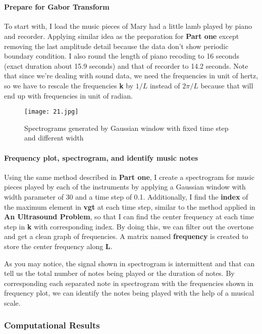 \documentclass[10pt]{article}
\begin{document}
\part{}
\subsection*{Prepare for Gabor Transform}
To start with, I load the music pieces of Mary had a little lamb played by piano and recorder. Applying similar idea as the preparation for \textbf{Part one} except removing the last amplitude detail because the data don't show periodic boundary condition. I also round the length of piano recoding to 16 seconds (exact duration about 15.9 seconds) and that of recorder to 14.2 seconds. Note that since we're dealing with sound data, we need the frequencies in unit of hertz, so we have to rescale the frequencies \textbf{k} by $1/L$ instead of $2\pi/L$ because that will end up with frequencies in unit of radian.
\begin{figure}[!hb]
	\texttt{[image: 21.jpg]}
    \caption{Spectrograms generated by Gaussian window with fixed time step and different width}
    \centering
\end{figure}
\subsection*{Frequency plot, spectrogram, and identify music notes}
Using the same method described in \textbf{Part one}, I create a spectrogram for music pieces played by each of the instruments by applying a Gaussian window with width parameter of 30 and a time step of 0.1. Additionally, I find the \textbf{index} of the maximum element in \textbf{vgt} at each time step, similar to the method applied in \textbf{An Ultrasound Problem}, so that I can find the center frequency at each time step in \textbf{k} with corresponding index. By doing this, we can filter out the overtone and get a clean graph of frequencies. A matrix named \textbf{frequency} is created to store the center frequency along \textbf{L}.
\par
As you may notice, the signal shown in spectrogram is intermittent and that can tell us the total number of notes being played or the duration of notes. By corresponding each separated note in spectrogram with the frequencies shown in frequency plot, we can identify the notes being played with the help of a musical scale.



\section{Computational Results}
\end{document}
